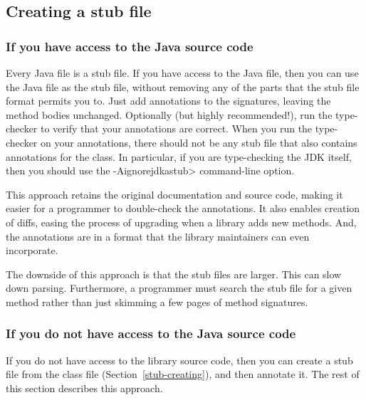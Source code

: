 \subsection{Creating a stub file\label{stub-creating}}


\subsubsection{If you have access to the Java source code}

Every Java file is a stub file.  If you have access to the Java file, then
you can use the Java file as the stub file, without removing
any of the parts that the stub file format permits you to.  Just add
annotations to the signatures, leaving the method bodies unchanged.
Optionally (but highly recommended!), run the type-checker to verify that
your annotations are correct.  When you run the type-checker on your
annotations, there should not be any stub file that also contains
annotations for the class.  In particular, if you are type-checking the JDK
itself, then you should use the \<-Aignorejdkastub> command-line option.

This approach retains the original
documentation and source code, making it easier for a programmer to
double-check the annotations.  It also enables creation of diffs, easing
the process of upgrading when a library adds new methods.  And, the
annotations are in a format that the library maintainers can even
incorporate.

The downside of this approach is that the stub files are larger.  This can
slow down parsing.  Furthermore, a programmer must search the stub file
for a given method rather than just skimming a few pages of method signatures.


\subsubsection{If you do not have access to the Java source code}

If you do not have access to the library source code, then you can create a
stub file from the class file (Section~\ref{stub-creating}),
and then annotate it.  The rest of this section describes this approach.


